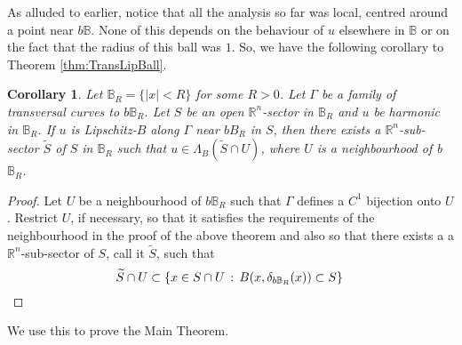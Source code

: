 \documentclass[12pt,a4paper]{amsart}
\numberwithin{equation}{section}
\newtheorem{cor}[equation]{Corollary}
\theoremstyle{definition}
\begin{document}
As alluded to earlier, notice that all the analysis so far was local, centred around a point near $b\mathbb{B}$. None of this depends on the behaviour of $u$ elsewhere in $\mathbb{B}$ or on the fact that the radius of this ball was $1$. So, we have the following corollary to Theorem \ref{thm:TransLipBall}.

\begin{cor}\label{CorMainThm} Let $\mathbb{B}_R = \{{\left\lvert{x}\right\rvert} < R\}$ for some $R>0$. Let $\Gamma$ be a family of transversal curves to $b\mathbb{B}_R$. Let $S$ be an 
open $\mathbb{R}^n$-sector in $\mathbb{B}_R$ and $u$ be harmonic in $\mathbb{B}_R$. If $u$ is Lipschitz-$B$ along $\Gamma$ near $bB_R$ in $S$, then there exists a $\mathbb{R}^n$-sub-sector 
$\widetilde{S}$ of $S$ in $\mathbb{B}_R$ such that $u\in\Lambda_{B}(\widetilde{S}\cap U)$, where $U$ is a neighbourhood of b$\mathbb{B}_R$.
\end{cor}
\begin{proof} Let $U$ be a neighbourhood of $b\mathbb{B}_R$ such that $\Gamma$ defines a $C^1$ bijection onto $U$. Restrict $U$, if necessary, so that it satisfies the requirements of the neighbourhood in 
the proof of the above theorem and also so that there exists a a $\mathbb{R}^n$-sub-sector of $S$, call it $\widetilde{S}$, such that
\[\widetilde{S} \cap U \subset \left\{x\in S \cap U\, :\, B(x,\delta_{b\mathbb{B}_R}(x)) \subset S\right\}\qedhere\]
\end{proof}

We use this to prove the Main Theorem.
\end{document}
